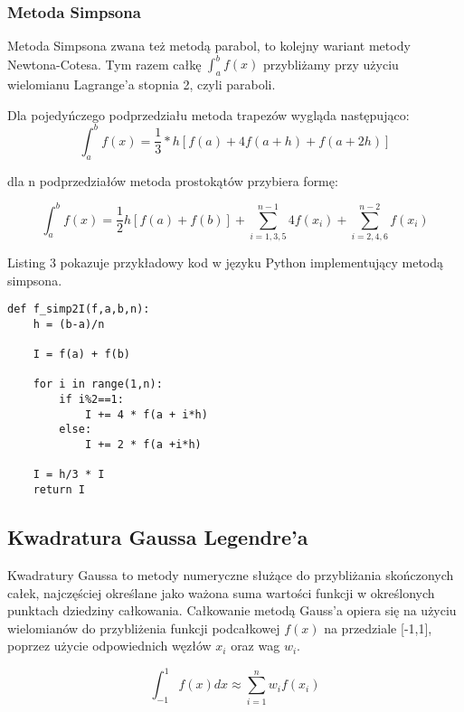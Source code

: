 \documentclass[12pt,twoside]{article}
\begin{document}
\subsubsection{Metoda Simpsona}
Metoda Simpsona zwana też metodą parabol, to kolejny wariant metody Newtona-Cotesa. Tym razem całkę $\int_a^b f(x)$ przybliżamy przy użyciu wielomianu Lagrange'a stopnia 2, czyli paraboli.

Dla pojedyńczego podprzedziału metoda trapezów wygląda następująco:
\begin{equation}
\int_a^b f(x) =  \frac{1}{3}*h[f(a) + 4f(a+h) + f(a+2h)]
\label{Eq:rownanie}
\end{equation}

dla n podprzedziałów metoda prostokątów przybiera formę:

\begin{equation}
\int_a^b f(x) =  \frac{1}{2}h {[f(a) + f(b)] + \sum_{i=1,3,5}^{n-1}4f(x_i) + \sum_{i=2,4,6}^{n-2} f(x_i) }
\label{Eq:rownanie}
\end{equation}

Listing 3 pokazuje przykładowy kod w języku Python implementujący metodą simpsona.

\begin{lstlisting}[caption={Kod w języku python implementujący metodę Simpsona}]
def f_simp2I(f,a,b,n):
    h = (b-a)/n

    I = f(a) + f(b)

    for i in range(1,n):
        if i%2==1:
            I += 4 * f(a + i*h)
        else:
            I += 2 * f(a +i*h)

    I = h/3 * I
    return I

\end{lstlisting}
\label{Listing 2}

\subsection{Kwadratura Gaussa Legendre'a}
Kwadratury Gaussa to metody numeryczne służące do przybliżania skończonych całek, najczęściej określane jako ważona suma wartości funkcji w określonych punktach dziedziny całkowania.
Całkowanie metodą Gauss'a opiera się na użyciu wielomianów do przybliżenia funkcji podcałkowej $f(x)$ na przedziale [-1,1], poprzez użycie odpowiednich węzłów $x_i$ oraz wag $w_i$.
	
\begin{equation}
\int_{-1}^{1} f(x) dx \approx \sum_{i=1}^{n} w_if(x_i)
\label{Eq:Gauss}
\end{equation}
\end{document}
